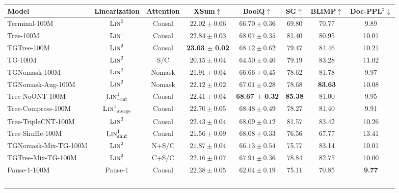 \documentclass[11pt]{article}
\begin{document}
\begin{table}[htbp]
  \centering
  \footnotesize
  \setlength{\tabcolsep}{2.2pt}
  \begin{tabular}{lccc@{\hspace{6pt}}c@{\hspace{6pt}}c@{\hspace{6pt}}c@{\hspace{6pt}}c}
    \toprule
    Model & Linearization & Attention & XSum$\uparrow$ & BoolQ$\uparrow$ & SG$\uparrow$ & BLiMP$\uparrow$ & Doc-PPL$^\ddagger$$\downarrow$ \\
    \midrule
    Terminal-100M & $\textsc{Lin}^0$ & Causal & $22.02 \pm 0.06$ & $66.70 \pm 0.36$ & 69.80 & 70.77 & 9.89 \\
    Tree-100M & $\textsc{Lin}^1$ & Causal & $22.84 \pm 0.03$ & $68.07 \pm 0.35$ & 81.40 & 80.95 & 10.01 \\
    TGTree-100M & $\textsc{Lin}^2$ & Causal & \textbf{23.03 $\pm$ 0.02} & $68.12 \pm 0.62$ & 79.47 & 81.46 & 10.21 \\
    TG-100M & $\textsc{Lin}^2$ & S/C & $20.15 \pm 0.04$ & $64.50 \pm 0.40$ & 79.19 & 83.28 & 11.02 \\
    TGNomask-100M & $\textsc{Lin}^2$ & Nomask & $21.91 \pm 0.04$ & $66.66 \pm 0.45$ & 78.62 & 81.78 & 9.97 \\
    TGNomask-Aug-100M & $\textsc{Lin}^2$ & Nomask & $22.12 \pm 0.02$ & $67.01 \pm 0.28$ & 78.68 & \textbf{83.63} & 10.08 \\
    Tree-NoONT-100M & $\textsc{Lin}^1_{\text{--ont}}$ & Causal & $22.41 \pm 0.04$ & \textbf{68.67 $\pm$ 0.32} & \textbf{85.38} & 81.00 & 9.95 \\
    Tree-Compress-100M & $\textsc{Lin}^1_{\text{--merge}}$ & Causal & $22.70 \pm 0.05$ & $68.48 \pm 0.49$ & 78.27 & 81.40 & 9.91 \\
    Tree-TripleCNT-100M & $\textsc{Lin}^3$ & Causal & $22.43 \pm 0.04$ & $68.09 \pm 0.12$ & 81.57 & 83.42 & 10.26 \\
    Tree-Shuffle-100M & $\textsc{Lin}^1_{\text{shuf}}$ & Causal & $21.56 \pm 0.09$ & $68.08 \pm 0.33$ & 76.56 & 67.77 & 13.41 \\
    TGNomask-Mix-TG-100M & $\textsc{Lin}^2$ & N+S/C & $21.87 \pm 0.04$ & $66.13 \pm 0.54$ & 75.77 & 83.14 & 10.01 \\
    TGTree-Mix-TG-100M & $\textsc{Lin}^2$ & C+S/C & $22.16 \pm 0.07$ & $67.91 \pm 0.36$ & 78.84 & 82.75 & 10.00 \\
    Pause-1-100M & Pause-1 & Causal & $22.38 \pm 0.05$ & $62.04 \pm 0.19$ & 75.11 & 70.85 & \textbf{9.77} \\
$$
\end{tabular}
\end{table}
\end{document}
